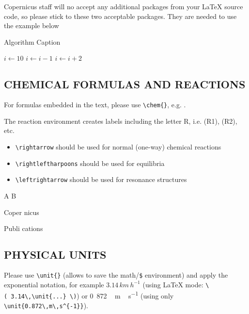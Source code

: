 \documentclass[gc, manuscript]{copernicus}
\begin{document}
Copernicus staff will no accept any additional packages from your LaTeX
source code, so please stick to these two acceptable packages. They are
needed to use the example below

\begin{algorithm}
\caption{Algorithm Caption}
\label{a1}
\begin{algorithmic}
\STATE $i\gets 10$
        \STATE $i\gets i-1$
\ELSE
                \STATE $i\gets i+2$
        \ENDIF
\ENDIF
\end{algorithmic}
\end{algorithm}

\subsection{CHEMICAL FORMULAS AND REACTIONS}

For formulas embedded in the text, please use
\texttt{\textbackslash{}chem\{\}}, e.g. .

The reaction environment creates labels including the letter R, i.e.
(R1), (R2), etc.

\begin{itemize}
\item
  \texttt{\textbackslash{}rightarrow} should be used for normal
  (one-way) chemical reactions
\item
  \texttt{\textbackslash{}rightleftharpoons} should be used for
  equilibria
\item
  \texttt{\textbackslash{}leftrightarrow} should be used for resonance
  structures
\end{itemize}

\begin{reaction}
A \rightarrow B \\
\end{reaction}
\begin{reaction}
Coper \rightleftharpoons nicus \\
\end{reaction}
\begin{reaction}
Publi \leftrightarrow cations
\end{reaction}

\subsection{PHYSICAL UNITS}

Please use \texttt{\textbackslash{}unit\{\}} (allows to save the
math/\texttt{\$} environment) and apply the exponential notation, for
example \(3.14\,\unit{km\,h^{-1}}\) (using LaTeX mode:
\texttt{\textbackslash{}(\ 3.14\textbackslash{},\textbackslash{}unit\{...\}\ \textbackslash{})})
or \unit{0.872\,m\,s^{-1}} (using only
\texttt{\textbackslash{}unit\{0.872\textbackslash{},m\textbackslash{},s\^{}\{-1\}\}}).
\end{document}
